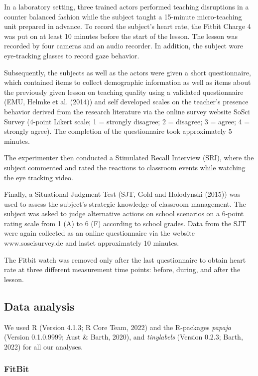 \documentclass[
  man]{apa6}
\begin{document}
In a laboratory setting, three trained actors performed teaching disruptions in a counter balanced fashion while the subject taught a 15-minute micro-teaching unit prepared in advance. To record the subject's heart rate, the Fitbit Charge 4 was put on at least 10 minutes before the start of the lesson. The lesson was recorded by four cameras and an audio recorder. In addition, the subject wore eye-tracking glasses to record gaze behavior.

Subsequently, the subjects as well as the actors were given a short questionnaire, which contained items to collect demographic information as well as items about the previously given lesson on teaching quality using a validated questionnaire (EMU, Helmke et al. (2014)) and self developed scales on the teacher's presence behavior derived from the research literature via the online survey website SoSci Survey (4-point Likert scale; 1 = strongly disagree; 2 = disagree; 3 = agree; 4 = strongly agree). The completion of the questionnaire took approximately 5 minutes.

The experimenter then conducted a Stimulated Recall Interview (SRI), where the subject commented and rated the reactions to classroom events while watching the eye tracking video.

Finally, a Situational Judgment Test (SJT, Gold and Holodynski (2015)) was used to assess the subject's strategic knowledge of classroom management. The subject was asked to judge alternative actions on school scenarios on a 6-point rating scale from 1 (A) to 6 (F) according to school grades. Data from the SJT were again collected as an online questionnaire via the website www.soscisurvey.de and lastet approximately 10 minutes.

The Fitbit watch was removed only after the last questionnaire to obtain heart rate at three different measurement time points: before, during, and after the lesson.

\hypertarget{data-analysis}{%
\subsection{Data analysis}\label{data-analysis}}

We used R (Version 4.1.3; R Core Team, 2022) and the R-packages \emph{papaja} (Version 0.1.0.9999; Aust \& Barth, 2020), and \emph{tinylabels} (Version 0.2.3; Barth, 2022) for all our analyses.

\hypertarget{fitbit}{%
\subsubsection{FitBit}\label{fitbit}}
\end{document}

